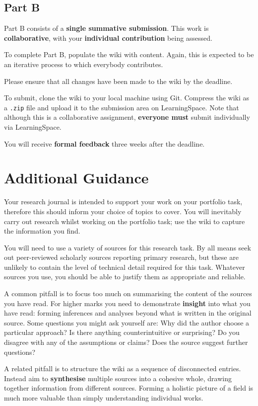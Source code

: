 \documentclass{../../fal_assignment}
\begin{document}
\subsection*{Part B}

Part B consists of a \textbf{single summative submission}. This work is \textbf{collaborative},
with your \textbf{individual contribution} being assessed.

To complete Part B, populate the wiki with content.
Again, this is expected to be an iterative process to which everybody contributes.

Please ensure that all changes have been made to the wiki by the deadline.

To submit, clone the wiki to your local machine using Git.
Compress the wiki as a \texttt{.zip} file and upload it to the submission area on LearningSpace.
Note that although this is a collaborative assignment,
\textbf{everyone must} submit individually via LearningSpace.

You will receive \textbf{formal feedback} three weeks after the deadline.

\section*{Additional Guidance}

Your research journal is intended to support your work on your portfolio task,
therefore this should inform your choice of topics to cover.
You will inevitably carry out research whilst working on the portfolio task;
use the wiki to capture the information you find.

You will need to use a variety of sources for this research task.
By all means seek out peer-reviewed scholarly sources reporting primary research,
but these are unlikely to contain the level of technical detail required for this task.
Whatever sources you use, you should be able to justify them as appropriate and reliable.

A common pitfall is to focus too much on summarising the content of the sources you have read.
For higher marks you need to demonstrate \textbf{insight} into what you have read:
forming inferences and analyses beyond what is written in the original source.
Some questions you might ask yourself are:
Why did the author choose a particular approach?
Is there anything counterintuitive or surprising?
Do you disagree with any of the assumptions or claims?
Does the source suggest further questions?

A related pitfall is to structure the wiki as a sequence of disconnected entries.
Instead aim to \textbf{synthesise} multiple sources into a cohesive whole,
drawing together information from different sources.
Forming a holistic picture of a field is much more valuable than simply understanding individual works.
\end{document}
